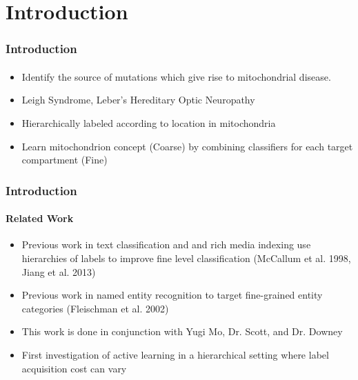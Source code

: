 \documentclass{beamer}
\begin{document}
\section{Introduction}
\begin{frame}
    \frametitle{Introduction}
    \framesubtitle{}
    \begin{itemize}
      \item Identify the source of mutations which give rise to mitochondrial disease.
      \item Leigh Syndrome, Leber’s Hereditary Optic Neuropathy %
      \item Hierarchically labeled according to location in mitochondria
      \item Learn mitochondrion concept (Coarse) by combining classifiers for each target compartment (Fine)
    \end{itemize}
\end{frame}
\begin{frame}
    \frametitle{Introduction}
    \framesubtitle{Related Work}
    \begin{itemize}
      \item Previous work in text classification and and rich media indexing use hierarchies of
      labels to improve fine level classification (McCallum et al. 1998, Jiang et al. 2013)
      \item Previous work in named entity recognition to target fine-grained entity categories (Fleischman et al. 2002)
      \item This work is done in conjunction with Yugi Mo, Dr. Scott, and Dr. Downey
      \item First investigation of active learning in a hierarchical setting where label acquisition cost can vary
    \end{itemize}
\end{frame}
\end{document}
